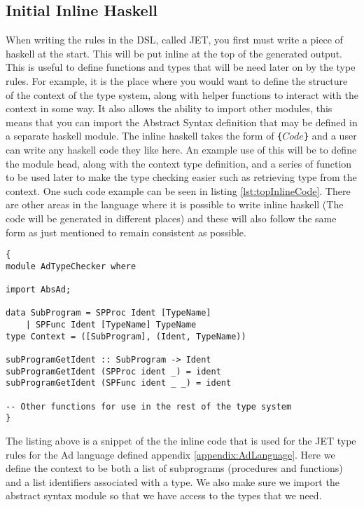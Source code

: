 \subsection{Initial Inline Haskell}
When writing the rules in the DSL, called JET, you first must write a piece of haskell at the start.
This will be put inline at the top of the generated output.
This is useful to define functions and types that will be need later on by the type rules.
For example, it is the place where you would want to define the structure of the context of the type system, along with helper functions to interact with the context in some way.
It also allows the ability to import other modules, this means that you can import the Abstract Syntax definition that may be defined in a separate haskell module.
The inline haskell takes the form of \texttt{\{$Code$\}} and a user can write any haskell code they like here.
An example use of this will be to define the module head, along with the context type definition, and a series of function to be used later to make the type checking easier such as retrieving type from the context.
One such code example can be seen in listing \ref{lst:topInlineCode}.
There are other areas in the language where it is possible to write inline haskell (The code will be generated in different places) and these will also follow the same form as just mentioned to remain consistent as possible.

\begin{lstlisting}[caption = Example of the inline code to be generated at the top, label=lst:topInlineCode]
{
module AdTypeChecker where

import AbsAd;

data SubProgram = SPProc Ident [TypeName] 
    | SPFunc Ident [TypeName] TypeName
type Context = ([SubProgram], (Ident, TypeName))

subProgramGetIdent :: SubProgram -> Ident
subProgramGetIdent (SPProc ident _) = ident
subProgramGetIdent (SPFunc ident _ _) = ident

-- Other functions for use in the rest of the type system
}
\end{lstlisting}

The listing above is a snippet of the the inline code that is used for the JET type rules for the Ad language defined appendix \ref{appendix:AdLanguage}.
Here we define the context to be both a list of subprograms (procedures and functions) and a list identifiers associated with a type.
We also make sure we import the abstract syntax module so that we have access to the types that we need.

